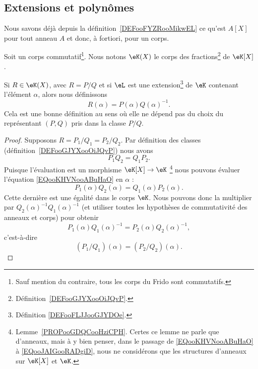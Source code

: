 \subsection{Extensions et polynômes}

Nous savons déjà depuis la définition~\ref{DEFooFYZRooMikwEL} ce qu'est \( A[X]\) pour tout anneau \( A\) et donc, à fortiori, pour un corps.

\begin{definition}  \label{DEFooQPZIooQYiNVh}
	Soit un corps commutatif\footnote{Sauf mention du contraire, tous les corps du Frido sont commutatifs.}. Nous notons \( \eK(X)\) le corps des fractions\footnote{Définition~\ref{DEFooGJYXooOiJQvP}.} de \( \eK[X]\).
\end{definition}

\begin{lemmaDef}        \label{DEFooZHBZooKlNfGZ}
	Si \( R\in \eK(X)\), avec \( R=P/Q\) et si \( \eL\) est une extension\footnote{Définition \ref{DEFooFLJJooGJYDOe}.} de \( \eK\) contenant l'élément \( \alpha\), alors nous définissons
	\begin{equation}
		R(\alpha)=P(\alpha)Q(\alpha)^{-1}.
	\end{equation}
	Cela est une bonne définition au sens où elle ne dépend pas du choix du représentant \( (P,Q)\) pris dans la classe \( P/Q\).
\end{lemmaDef}

\begin{proof}
	Supposons \( R=P_1/Q_1=P_2/Q_2\). Par définition des classes (définition~\ref{DEFooGJYXooOiJQvP}) nous avons
	\begin{equation}        \label{EQooKHVNooABuHaO}
		P_1Q_2=Q_1P_2.
	\end{equation}
	Puisque l'évaluation est un morphisme \( \eK[X]\to\eK\) \footnote{Lemme~\ref{PROPooGDQCooHziCPH}.
		Certes ce lemme ne parle que d'anneaux, mais à y bien penser, dans le passage de \eqref{EQooKHVNooABuHaO} à \eqref{EQooJAIGooRADgiD}, nous ne considérons que les structures d'anneaux sur \( \eK[X]\) et \( \eK\).} nous pouvons évaluer l'équation \eqref{EQooKHVNooABuHaO} en \( \alpha\) :
	\begin{equation}        \label{EQooJAIGooRADgiD}
		P_1(\alpha)Q_2(\alpha)=Q_1(\alpha)P_2(\alpha).
	\end{equation}
	Cette dernière est une égalité dans le corps \( \eK\). Nous pouvons donc la multiplier par \(  Q_2(\alpha)^{-1}Q_1(\alpha)^{-1} \) (et utiliser toutes les hypothèses de commutativité des anneaux et corps) pour obtenir
	\begin{equation}
		P_1(\alpha)Q_1(\alpha)^{-1}=P_2(\alpha)Q_2(\alpha)^{-1},
	\end{equation}
	c'est-à-dire
	\begin{equation}
		(P_1/Q_1)(\alpha)=(P_2/Q_2)(\alpha).
	\end{equation}
\end{proof}

